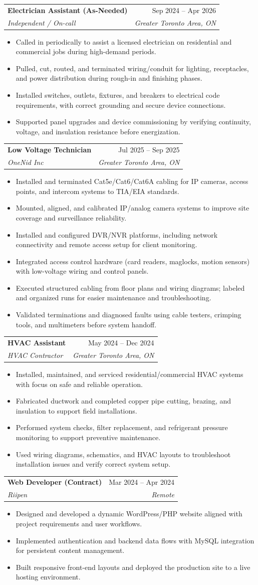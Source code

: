 \documentclass[letterpaper,11pt]{article}
\makeatletter
\newcommand{\resumeItem}[1]{\item\small{{#1 \vspace{-2pt}}}}
\newcommand{\resumeSubheading}[4]{
  \vspace{-2pt}\item
    \begin{tabular*}{0.97\textwidth}[t]{l@{\extracolsep{\fill}}r}
      \textbf{#1} & #2 \\
      \textit{\small #3} & \textit{\small #4} \\
    \end{tabular*}\vspace{-7pt}
}
\newcommand{\resumeItemListStart}{\begin{itemize}}
\newcommand{\resumeItemListEnd}{\end{itemize}\vspace{-5pt}}
\makeatother
\begin{document}
\resumeSubheading
  {Electrician Assistant (As-Needed)}{Sep 2024 -- Apr 2026}
  {Independent / On-call}{Greater Toronto Area, ON}
\resumeItemListStart
  \resumeItem{Called in periodically to assist a licensed electrician on residential and commercial jobs during high-demand periods.}
  \resumeItem{Pulled, cut, routed, and terminated wiring/conduit for lighting, receptacles, and power distribution during rough-in and finishing phases.}
  \resumeItem{Installed switches, outlets, fixtures, and breakers to electrical code requirements, with correct grounding and secure device connections.}
  \resumeItem{Supported panel upgrades and device commissioning by verifying continuity, voltage, and insulation resistance before energization.}
\resumeItemListEnd

\resumeSubheading
  {Low Voltage Technician}{Jul 2025 -- Sep 2025}
  {OneNid Inc}{Greater Toronto Area, ON}
\resumeItemListStart
  \resumeItem{Installed and terminated Cat5e/Cat6/Cat6A cabling for IP cameras, access points, and intercom systems to TIA/EIA standards.}
  \resumeItem{Mounted, aligned, and calibrated IP/analog camera systems to improve site coverage and surveillance reliability.}
  \resumeItem{Installed and configured DVR/NVR platforms, including network connectivity and remote access setup for client monitoring.}
  \resumeItem{Integrated access control hardware (card readers, maglocks, motion sensors) with low-voltage wiring and control panels.}
  \resumeItem{Executed structured cabling from floor plans and wiring diagrams; labeled and organized runs for easier maintenance and troubleshooting.}
  \resumeItem{Validated terminations and diagnosed faults using cable testers, crimping tools, and multimeters before system handoff.}
\resumeItemListEnd

\resumeSubheading
  {HVAC Assistant}{May 2024 -- Dec 2024}
  {HVAC Contractor}{Greater Toronto Area, ON}
\resumeItemListStart
  \resumeItem{Installed, maintained, and serviced residential/commercial HVAC systems with focus on safe and reliable operation.}
  \resumeItem{Fabricated ductwork and completed copper pipe cutting, brazing, and insulation to support field installations.}
  \resumeItem{Performed system checks, filter replacement, and refrigerant pressure monitoring to support preventive maintenance.}
  \resumeItem{Used wiring diagrams, schematics, and HVAC layouts to troubleshoot installation issues and verify correct system setup.}
\resumeItemListEnd

\resumeSubheading
  {Web Developer (Contract)}{Mar 2024 -- Apr 2024}
  {Riipen}{Remote}
\resumeItemListStart
  \resumeItem{Designed and developed a dynamic WordPress/PHP website aligned with project requirements and user workflows.}
  \resumeItem{Implemented authentication and backend data flows with MySQL integration for persistent content management.}
  \resumeItem{Built responsive front-end layouts and deployed the production site to a live hosting environment.}
\resumeItemListEnd
\end{document}
